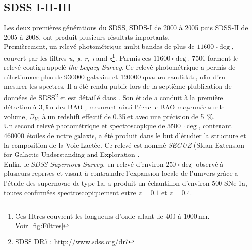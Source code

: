 \documentclass[11pt, twoside, a4paper, openright]{report}
\begin{document}
\subsection{SDSS I-II-III}
Les deux premières générations du SDSS, SDDS-I de 2000 à 2005 puis SDSS-II de 2005 à 2008, ont produit plusieurs résultats importants.\\
Premièrement, un relevé photométrique multi-bandes de plus de $\SI{11600}{\square\deg}$, couvert par les filtres \emph{u, g, r, i} and \emph{z}\footnote{Ces filtres couvrent les longueurs d'onde allant de $400$ à $1000\,\mathrm{nm}$. Voir~\ref{fig:Filtres}}. Parmis ces $\SI{11600}{\square\deg}$, \num{7500} forment le relevé contigu appelé \emph{the Legacy Survey}. Ce relevé photométrique a permis de sélectionner plus de \num{930000} galaxies et \num{120000} quasars candidats, afin d'en mesurer les spectres. Il a été rendu public lors de la septième plublication de données de SDSS\footnote{SDSS DR7 : http://www.sdss.org/dr7} et est détaillé dans \textcite{Abazajian2008}. Son étude a conduit à la première détection à $3,6\,\sigma$ des BAO \autocite{Eisenstein2005}, mesurant ainsi l'échelle BAO moyennée sur le volume, $D_V$, à un redshift effectif de \num{0,35} et avec une précision de \SI{5}{\percent}. \\
Un second relevé photométrique et spectroscopique de $\SI{3500}{\square\deg}$, contenant \num{460000} étoiles de notre galaxie, a été produit dans le but d'étudier la structure et la composition de la Voie Lactée. Ce relevé est nommé \emph{SEGUE} (Sloan Extension for Galactic Understanding and Exploration \autocite{Collaboration2009}.\\
Enfin, le \emph{SDSS Supernova Survey}, un relevé d'environ $\SI{250}{\square\deg}$ observé à plusieurs reprises et visant à contraindre l'expansion locale de l'univers gr\^ace à l'étude des supernovae de type 1a, a produit un échantillon d'environ 500 SNe 1a, toutes confirmées spectroscopiquement entre $z=\num{0,1}$ et $z=\num{0,4}$.
\end{document}
